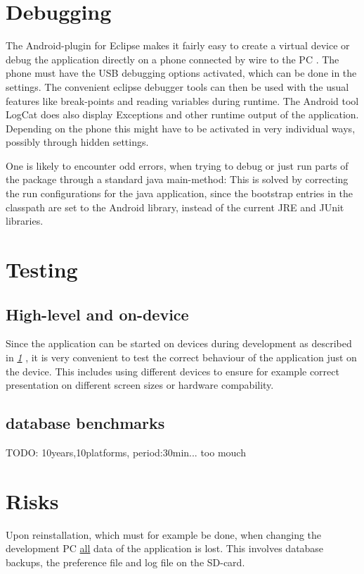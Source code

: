 \documentclass[11pt,oneside,a4paper]{scrartcl}
\begin{document}
\section{Debugging}\label{sec:Debugging}
The Android-plugin for Eclipse makes it fairly easy to create a virtual device or debug the application directly on a phone connected by wire to the PC . The phone must have the USB debugging options activated, which can be done in the settings. The convenient eclipse debugger tools can then be used with the usual features like break-points and reading variables during runtime. The Android tool LogCat does also display Exceptions and other runtime output of the application. Depending on the phone this might have to be activated in very individual ways, possibly through hidden settings.

One is likely to encounter odd errors, when trying to debug or just run parts of the package through a standard java main-method: This is solved by correcting the run configurations for the java application, since the bootstrap entries in the classpath are set to the Android library, instead of the current JRE and JUnit libraries.


\section{Testing}
\subsection{High-level and on-device}
Since the application can be started on devices during development as described in \textit{\ref{sec:Debugging} }, it is very convenient to test the correct behaviour of the application just on the device. This includes using different devices to ensure for example correct presentation on different screen sizes or hardware compability.

\subsection{database benchmarks}
TODO: 10years,10platforms, period:30min... too mouch

\section{Risks}
Upon reinstallation, which must for example be done, when changing the development PC \underline{all} data of the application is lost. This involves database backups, the preference file and log file on the SD-card.
\end{document}
